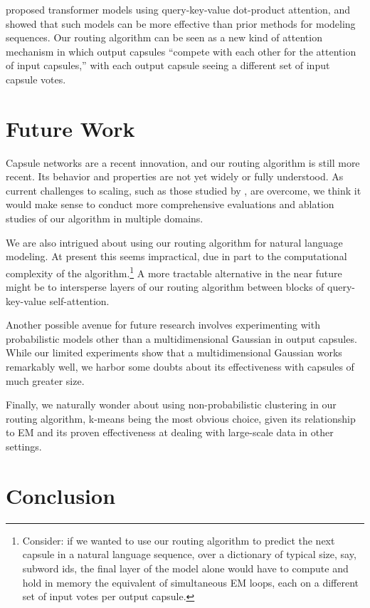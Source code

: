 \documentclass[11pt,a4paper]{article}
\begin{document}
\citet{DBLP:journals/corr/VaswaniSPUJGKP17} proposed transformer models using query-key-value dot-product attention, and showed that such models can be more effective than prior methods for modeling sequences. Our routing algorithm can be seen as a new kind of attention mechanism in which output capsules ``compete with each other for the attention of input capsules,'' with each output capsule seeing a different set of input capsule votes.

\section{Future Work}

Capsule networks are a recent innovation, and our routing algorithm is still more recent. Its behavior and properties are not yet widely or fully understood. As current challenges to scaling, such as those studied by \citet{Barham:2019:MLS:3317550.3321441}, are overcome, we think it would make sense to conduct more comprehensive evaluations and ablation studies of our algorithm in multiple domains.

We are also intrigued about using our routing algorithm for natural language modeling. At present this seems impractical, due in part to the computational complexity of the algorithm.\footnote{
	Consider: if we wanted to use our routing algorithm to predict the next capsule in a natural language sequence, over a dictionary of typical size, say,  subword ids, the final layer of the model alone would have to compute and hold in memory the equivalent of  simultaneous EM loops, each on a different set of input votes per output capsule.
} A more tractable alternative in the near future might be to intersperse layers of our routing algorithm between blocks of query-key-value self-attention.

Another possible avenue for future research involves experimenting with probabilistic models other than a multidimensional Gaussian in output capsules. While our limited experiments show that a multidimensional Gaussian works remarkably well, we harbor some doubts about its effectiveness with capsules of much greater size.

Finally, we naturally wonder about using non-probabilistic clustering in our routing algorithm, k-means being the most obvious choice, given its relationship to EM and its proven effectiveness at dealing with large-scale data in other settings.

\section{Conclusion}
\end{document}
